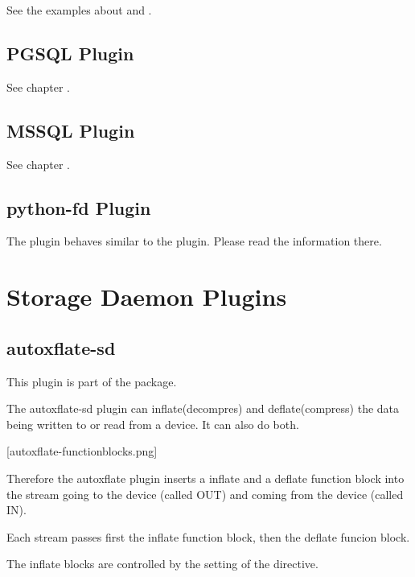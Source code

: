 See the examples about  and .


\subsection{PGSQL Plugin}

See chapter .


\subsection{MSSQL Plugin}

See chapter .


\subsection{python-fd Plugin}

The  plugin behaves similar to the  plugin.
Please read the information there.



\section{Storage Daemon Plugins}
\label{sdPlugins}

\subsection{autoxflate-sd}

This plugin is part of the  package.

The autoxflate-sd plugin can inflate(decompres) and deflate(compress)
the data being written to or read from a device. It can also do both.

[autoxflate-functionblocks.png]

Therefore the autoxflate plugin inserts a inflate and a deflate function block
into the stream going to the device (called OUT) and coming from the device (called IN).

Each stream passes first the inflate function block, then the deflate funcion block.

The inflate blocks are controlled by the setting of the 
directive.

